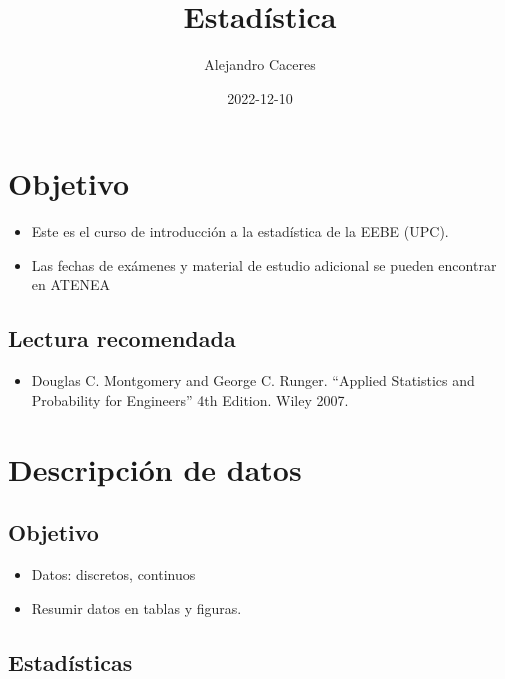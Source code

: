 \documentclass[
]{book}
\title{Estadística}
\author{Alejandro Caceres}
\date{2022-12-10}
\providecommand{\tightlist}{%
  \setlength{\itemsep}{0pt}\setlength{\parskip}{0pt}}
\begin{document}
\maketitle

{
\setcounter{tocdepth}{1}
\tableofcontents
}
\hypertarget{objetivo}{%
\chapter{Objetivo}\label{objetivo}}

\begin{itemize}
\item
  Este es el curso de introducción a la estadística de la EEBE (UPC).
\item
  Las fechas de exámenes y material de estudio adicional se pueden encontrar en ATENEA
\end{itemize}

\hypertarget{lectura-recomendada}{%
\section{Lectura recomendada}\label{lectura-recomendada}}

\begin{itemize}
\tightlist
\item
  Douglas C. Montgomery and George C. Runger. ``Applied Statistics and Probability for Engineers'' 4th Edition. Wiley 2007.
\end{itemize}

\hypertarget{descripciuxf3n-de-datos}{%
\chapter{Descripción de datos}\label{descripciuxf3n-de-datos}}

\hypertarget{objetivo-1}{%
\section{Objetivo}\label{objetivo-1}}

\begin{itemize}
\tightlist
\item
  Datos: discretos, continuos
\item
  Resumir datos en tablas y figuras.
\end{itemize}

\hypertarget{estaduxedsticas}{%
\section{Estadísticas}\label{estaduxedsticas}}
\end{document}
